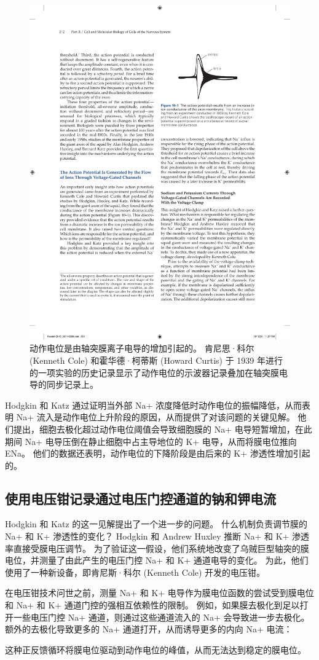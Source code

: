 \begin{figure}[htbp]
	\centering
	\includegraphics[width=0.5\linewidth]{chap10/fig_10_1}
	\caption{动作电位是由轴突膜离子电导的增加引起的。 肯尼思·科尔 (Kenneth Cole) 和霍华德·柯蒂斯 (Howard Curtis) 于 1939 年进行的一项实验的历史记录显示了动作电位的示波器记录叠加在轴突膜电导的同步记录上。}
	\label{fig:10_1}
\end{figure}


Hodgkin 和 Katz 通过证明当外部 Na+ 浓度降低时动作电位的振幅降低，从而表明 Na+ 流入是动作电位上升阶段的原因，从而提供了对该问题的关键见解。 
他们提出，细胞去极化超过动作电位阈值会导致细胞膜的 Na+ 电导短暂增加，在此期间 Na+ 电导压倒在静止细胞中占主导地位的 K+ 电导，从而将膜电位推向 ENa。 
他们的数据还表明，动作电位的下降阶段是由后来的 K+ 渗透性增加引起的。


\subsection{使用电压钳记录通过电压门控通道的钠和钾电流}
Hodgkin 和 Katz 的这一见解提出了一个进一步的问题。 
什么机制负责调节膜的 Na+ 和 K+ 渗透性的变化？ 
Hodgkin 和 Andrew Huxley 推断 Na+ 和 K+ 渗透率直接受膜电压调节。 
为了验证这一假设，他们系统地改变了乌贼巨型轴突的膜电位，并测量了由此产生的电压门控 Na+ 和 K+ 通道电导的变化。 
为此，他们使用了一种新设备，即肯尼斯·科尔 (Kenneth Cole) 开发的电压钳。


在电压钳技术问世之前，测量 Na+ 和 K+ 电导作为膜电位函数的尝试受到膜电位和 Na+ 和 K+ 通道门控的强相互依赖性的限制。 
例如，如果膜去极化到足以打开一些电压门控 Na+ 通道，则通过这些通道流入的 Na+ 会导致进一步去极化。 
额外的去极化导致更多的 Na+ 通道打开，从而诱导更多的内向 Na+ 电流：


这种正反馈循环将膜电位驱动到动作电位的峰值，从而无法达到稳定的膜电位。


